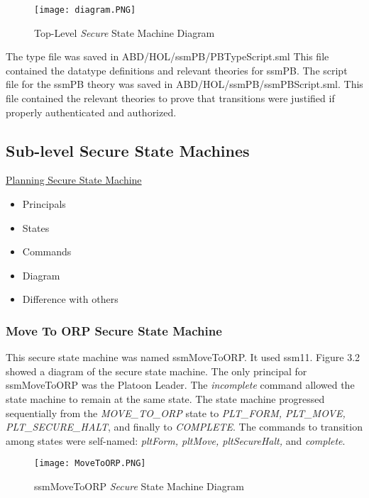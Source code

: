 \begin{figure}[h]
  \centering
  \texttt{[image: diagram.PNG]}
  \caption{Top-Level \emph{Secure} State Machine Diagram}
\end{figure}

The type file was saved in ABD/HOL/ssmPB/PBTypeScript.sml This file contained the datatype definitions and relevant theories for ssmPB.  The script file for the ssmPB theory was saved in ABD/HOL/ssmPB/ssmPBScript.sml.  This file contained the relevant theories to prove that transitions were justified if properly authenticated and authorized.

\subsection{Sub-level Secure State Machines}
\label{sec:sub-level-secure}

\underline{Planning Secure State Machine}
\begin{itemize}
\item Principals
\item States
\item Commands
\item Diagram
\item Difference with others
\end{itemize}


\subsubsection{Move To ORP Secure State Machine}
\label{sec:move-orp-secure}



This secure state machine was named ssmMoveToORP. It used ssm11.  Figure 3.2 showed a diagram of the secure state machine.  The only principal for ssmMoveToORP was the Platoon Leader.   The \emph{incomplete} command allowed the state machine to remain at the same state.  The state machine progressed sequentially from the \emph{MOVE_TO_ORP} state to \emph{PLT_FORM, PLT_MOVE, PLT_SECURE_HALT}, and finally to \emph{COMPLETE}.  The commands to transition among states were self-named: \emph{pltForm, pltMove, pltSecureHalt,} and \emph{complete}.  

\begin{figure}[h]
  \centering
  \texttt{[image: MoveToORP.PNG]}
  \caption{ssmMoveToORP \emph{Secure} State Machine Diagram}
\end{figure}

